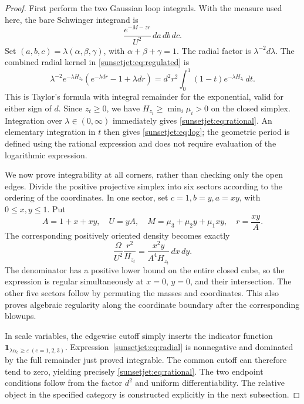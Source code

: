 \documentclass[11pt,a4paper,oneside]{article}
\theoremstyle{plain}
\theoremstyle{definition}
\theoremstyle{remark}
\numberwithin{equation}{section}
\begin{document}
\begin{proof}
First perform the two Gaussian loop integrals. With the measure used here, the bare Schwinger integrand is
\[
 \frac{e^{-M-zr}}{U^2}\,da\,db\,dc.
\]
Set $(a,b,c)=\lambda(\alpha,\beta,\gamma)$,
with $\alpha+\beta+\gamma=1$.
The radial factor is $\lambda^{-2}d\lambda$.
The combined radial kernel in \eqref{sunsetjet:eq:regulated} is
\begin{equation}\label{sunsetjet:eq:radial}
 \lambda^{-2}e^{-\lambda H_{z_0}}
       \left(e^{-\lambda d r}-1+\lambda d r\right)
 =d^2r^2\int_0^1(1-t)e^{-\lambda H_{z_t}}\,dt.
\end{equation}
This is Taylor's formula with integral remainder for the exponential, valid for either sign of $d$.
Since $z_t\geq0$, we have $H_{z_t}\geq\min_i\mu_i>0$ on the closed simplex.
Integration over $\lambda\in(0,\infty)$ immediately gives \eqref{sunsetjet:eq:rational}.
An elementary integration in $t$ then gives \eqref{sunsetjet:eq:log};
the geometric period is defined using the rational expression and does not require evaluation of the logarithmic expression.

We now prove integrability at all corners, rather than checking only the open edges.
Divide the positive projective simplex into six sectors according to the ordering of the coordinates.
In one sector, set $c=1,b=y,a=xy$, with $0\leq x,y\leq1$.
Put
\[
 A=1+x+xy,\quad U=yA,\quad
 M=\mu_3+\mu_2y+\mu_1xy,\quad r=\frac{xy}{A}.
\]
The corresponding positively oriented density becomes exactly
\begin{equation}\label{sunsetjet:eq:sector}
 \frac{\Omega}{U^2}\frac{r^2}{H_{z_t}}
   =\frac{x^2y}{A^4H_{z_t}}\,dx\,dy.
\end{equation}
The denominator has a positive lower bound on the entire closed cube, so the expression is regular simultaneously at $x=0$, $y=0$, and their intersection.
The other five sectors follow by permuting the masses and coordinates.
This also proves algebraic regularity along the coordinate boundary after the corresponding blowups.

In scale variables, the edgewise cutoff simply inserts the indicator function
$\mathbf1_{\lambda\alpha_e\geq\varepsilon\ (e=1,2,3)}$.
Expression~\eqref{sunsetjet:eq:radial} is nonnegative and dominated by the full remainder just proved integrable.
The common cutoff can therefore tend to zero, yielding precisely \eqref{sunsetjet:eq:rational}.
The two endpoint conditions follow from the factor $d^2$ and uniform differentiability.
The relative object in the specified category is constructed explicitly in the next subsection.
\end{proof}
\end{document}
